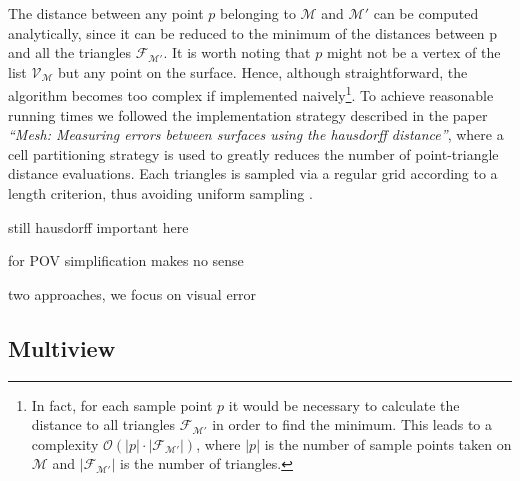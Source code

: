 The distance between any point $p$ belonging to $\mathcal{M}$ and $\mathcal{M}'$ can be computed analytically, since it can be reduced to the minimum of the distances between p and all the triangles $\mathcal{F}_{\mathcal{M}'}$.
It is worth noting that $p$ might not be a vertex of the list $\mathcal{V}_{\mathcal{M}}$ but any point on the surface.
Hence, although straightforward, the algorithm becomes too complex if implemented naively\footnote{ In fact, for each sample point $p$ it would be necessary to calculate the distance to all triangles $\mathcal{F}_{\mathcal{M}'}$ in order to find the minimum.
This leads to a complexity $\mathcal{O}(|p| \cdot |\mathcal{F}_{\mathcal{M}'}|)$, where $|p|$ is the number of sample points taken on $\mathcal{M}$ and $|\mathcal{F}_{\mathcal{M}'}|$ is the number of triangles.}.
To achieve reasonable running times we followed the implementation strategy described in the paper \textit{``Mesh: Measuring errors between surfaces using the hausdorff distance''}, where a cell partitioning strategy is used to greatly reduces the number of point-triangle distance evaluations.
Each triangles is sampled via a regular grid according to a length criterion, thus avoiding uniform sampling \citep[for more details see][especially chapter 3]{Aspert2002}.

still hausdorff important here

for POV simplification makes no sense

two approaches, we focus on visual error

\subsection{Multiview}
\label{topstoc52}
